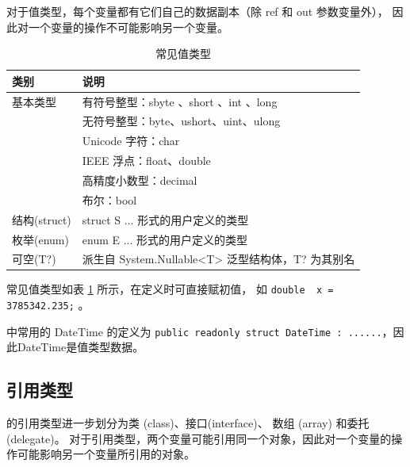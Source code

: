 对于值类型，每个变量都有它们自己的数据副本（除 ref 和 out 参数变量外），
因此对一个变量的操作不可能影响另一个变量。

\begin{table}[htbp]
    \centering
    \caption{常见值类型}
    \label{tab:valuetype}
    \begin{tabular}{l l}
        \hline
        类别         & 说明                                   \\
        \hline
        基本类型       & 有符号整型：sbyte 、short 、int 、long        \\
                   & 无符号整型：byte、ushort、uint、ulong         \\
                   & Unicode 字符：char                      \\
                   & IEEE 浮点：float、double                 \\
                   & 高精度小数型：decimal                       \\
                   & 布尔：bool                              \\
        结构(struct) & struct S {...} 形式的用户定义的类型            \\
        枚举(enum)   & enum E {...} 形式的用户定义的类型              \\
        可空(T?)     & 派生自 System.Nullable<T> 泛型结构体，T? 为其别名 \\
        \hline
    \end{tabular}
\end{table}

常见值类型如表 \ref{tab:valuetype} 所示，在定义时可直接赋初值，
如 \verb|double  x = 3785342.235;| 。

\cs 中常用的 DateTime 的定义为 \verb|public readonly struct DateTime : ......|，因此DateTime是值类型数据。

\subsection{引用类型}
\cs  的引用类型进一步划分为类 (class)、接口(interface)、
数组 (array) 和委托(delegate)。
对于引用类型，两个变量可能引用同一个对象，因此对一个变量的操作可能影响另一个变量所引用的对象。

